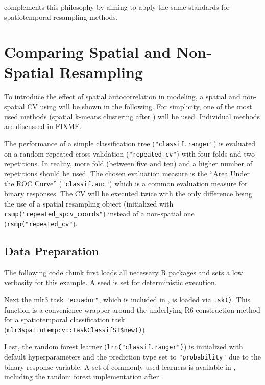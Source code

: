 \documentclass[
]{jss}
\begin{document}
 complements this philosophy by aiming to apply
the same standards for spatiotemporal resampling methods.

\hypertarget{comparing-spatial-and-non-spatial-resampling}{%
\section{Comparing Spatial and Non-Spatial
Resampling}\label{comparing-spatial-and-non-spatial-resampling}}

To introduce the effect of spatial autocorrelation in modeling, a
spatial and non-spatial CV using  will be shown in
the following. For simplicity, one of the most used methods (spatial
k-means clustering after \citet{sperrorest}) will be used. Individual
methods are discussed in FIXME.

The performance of a simple classification tree
(\texttt{"classif.ranger"}) is evaluated on a random repeated
cross-validation (\texttt{"repeated\_cv"}) with four folds and two
repetitions. In reality, more fold (between five and ten) and a higher
number of repetitions should be used. The chosen evaluation measure is
the ``Area Under the ROC Curve'' (\texttt{"classif.auc"}) which is a
common evaluation measure for binary responses. The CV will be executed
twice with the only difference being the use of a spatial resampling
object (initialized with \texttt{rsmp("repeated\_spcv\_coords"}) instead
of a non-spatial one (\texttt{rsmp("repeated\_cv"}).

\hypertarget{data-preparation}{%
\subsection{Data Preparation}\label{data-preparation}}

The following code chunk first loads all necessary R packages and sets a
low verbosity for this example. A seed is set for deterministic
execution.

Next the mlr3 task \texttt{"ecuador"}, which is included in
, is loaded via \texttt{tsk()}. This function is a
convenience wrapper around the underlying R6 construction method for a
spatiotemporal classification task
(\texttt{mlr3spatiotempcv::TaskClassifST\$new()}).

Last, the random forest learner (\texttt{lrn("classif.ranger")}) is
initialized with default hyperparameters and the prediction type set to
\texttt{"probability"} due to the binary response variable. A set of
commonly used learners is available in 
\citep{mlr3learners}, including the random forest implementation after
\citet{ranger}.
\end{document}
